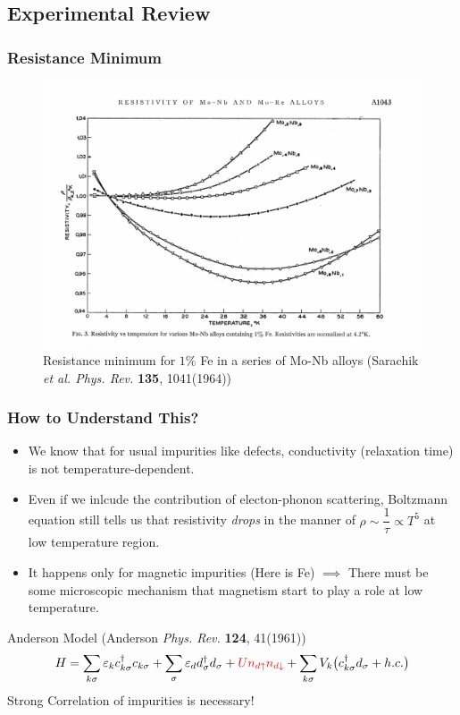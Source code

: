 \documentclass[10pt,aspectratio=43,xcolor=x11names]{beamer}%
\begin{document}
	\subsection{Experimental Review}
		\begin{frame}[t]\frametitle{Resistance Minimum}

			\begin{figure}[!htp]
				\centering
				\includegraphics[scale=0.5]{Mo-Nb.pdf}
				\caption{Resistance minimum for $1\%$ Fe in a series of Mo-Nb alloys (Sarachik \textit{et al. Phys. Rev. }\textbf{135}, 1041(1964))}
			\end{figure}
		\end{frame}
		\begin{frame}[t]\frametitle{How to Understand This?}
			\begin{itemize}
				\item We know that for usual impurities like defects, conductivity (relaxation time) is not temperature-dependent.
				\item Even if we inlcude the contribution of electon-phonon scattering, Boltzmann equation still tells us that resistivity \emph{drops} in the manner of $\rho\sim\dfrac{1}{\tau}\propto T^5$ at low temperature region.
				\item It happens only for {\color{blue}magnetic impurities} (Here is Fe) $\implies$ There must be some microscopic mechanism that magnetism start to play a role at low temperature.
			\end{itemize}
			\pause
			\begin{block}{Anderson Model (Anderson \textit{Phys. Rev.} \textbf{124}, 41(1961))}
				\begin{equation*}
					H=\sum_{k \sigma}\varepsilon_kc_{k\sigma}^\dagger c_{k\sigma}+\sum_{\sigma}\varepsilon_d d_{\sigma}^\dagger d_{\sigma}+{\color{red}Un_{d\uparrow}n_{d\downarrow}}+\sum_{k\sigma}V_k\big(c_{k\sigma}^\dagger d_{\sigma}+h.c.\big)
				\end{equation*}
				\centering Strong Correlation of impurities is necessary!
			\end{block}	
		\end{frame}
\end{document}
